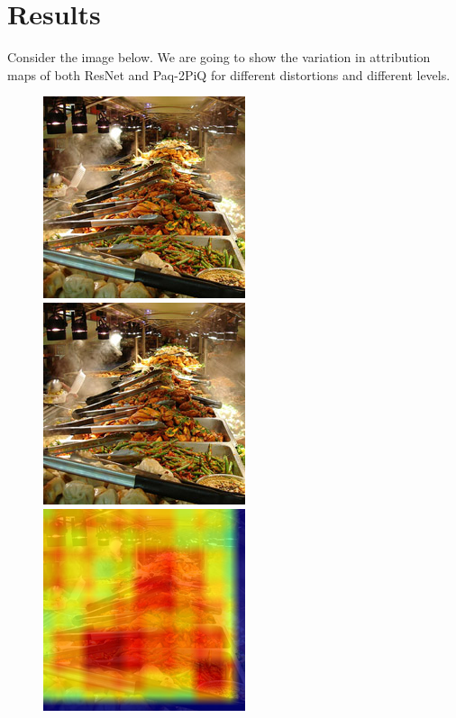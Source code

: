 \documentclass[10pt,twocolumn,letterpaper]{article}
\begin{document}
\section{Results}
Consider the image below. We are going to show the variation in attribution maps of both ResNet and Paq-2PiQ for different distortions and different levels.
\begin{figure}[!ht]
    \centering
    \includegraphics[width=.49\columnwidth]{Images/test_images/severity=-1/buffet.png}
    \hfill
    \includegraphics[width=.49\columnwidth]{Images/test_images/severity=0/buffet.png}\hfill
    \\[\smallskipamount]
    \includegraphics[width=.49\columnwidth]{Images/saliency_maps/paq2piq/severity=0/buffet.png}\hfill

\end{figure}
\end{document}
